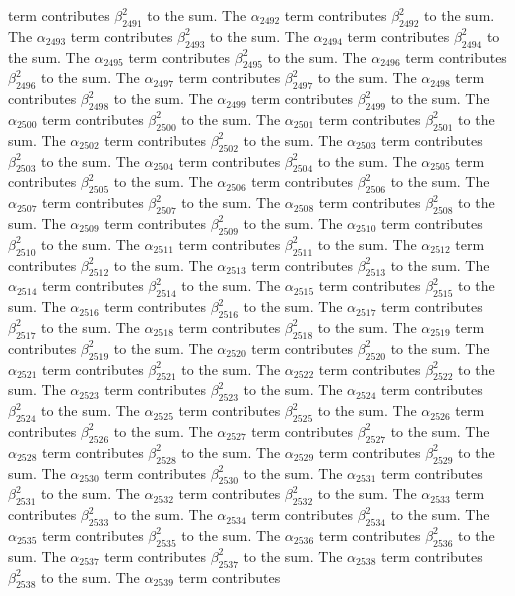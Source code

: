 \begin{lemma}
term contributes $\beta_{2491}^{2}$ to the sum. The $\alpha_{2492}$ term contributes $\beta_{2492}^{2}$ to the sum. The $\alpha_{2493}$ term contributes $\beta_{2493}^{2}$ to the sum. The $\alpha_{2494}$ term contributes $\beta_{2494}^{2}$ to the sum. The $\alpha_{2495}$ term contributes $\beta_{2495}^{2}$ to the sum. The $\alpha_{2496}$ term contributes $\beta_{2496}^{2}$ to the sum. The $\alpha_{2497}$ term contributes $\beta_{2497}^{2}$ to the sum. The $\alpha_{2498}$ term contributes $\beta_{2498}^{2}$ to the sum. The $\alpha_{2499}$ term contributes $\beta_{2499}^{2}$ to the sum. The $\alpha_{2500}$ term contributes $\beta_{2500}^{2}$ to the sum. The $\alpha_{2501}$ term contributes $\beta_{2501}^{2}$ to the sum. The $\alpha_{2502}$ term contributes $\beta_{2502}^{2}$ to the sum. The $\alpha_{2503}$ term contributes $\beta_{2503}^{2}$ to the sum. The $\alpha_{2504}$ term contributes $\beta_{2504}^{2}$ to the sum. The $\alpha_{2505}$ term contributes $\beta_{2505}^{2}$ to the sum. The $\alpha_{2506}$ term contributes $\beta_{2506}^{2}$ to the sum. The $\alpha_{2507}$ term contributes $\beta_{2507}^{2}$ to the sum. The $\alpha_{2508}$ term contributes $\beta_{2508}^{2}$ to the sum. The $\alpha_{2509}$ term contributes $\beta_{2509}^{2}$ to the sum. The $\alpha_{2510}$ term contributes $\beta_{2510}^{2}$ to the sum. The $\alpha_{2511}$ term contributes $\beta_{2511}^{2}$ to the sum. The $\alpha_{2512}$ term contributes $\beta_{2512}^{2}$ to the sum. The $\alpha_{2513}$ term contributes $\beta_{2513}^{2}$ to the sum. The $\alpha_{2514}$ term contributes $\beta_{2514}^{2}$ to the sum. The $\alpha_{2515}$ term contributes $\beta_{2515}^{2}$ to the sum. The $\alpha_{2516}$ term contributes $\beta_{2516}^{2}$ to the sum. The $\alpha_{2517}$ term contributes $\beta_{2517}^{2}$ to the sum. The $\alpha_{2518}$ term contributes $\beta_{2518}^{2}$ to the sum. The $\alpha_{2519}$ term contributes $\beta_{2519}^{2}$ to the sum. The $\alpha_{2520}$ term contributes $\beta_{2520}^{2}$ to the sum. The $\alpha_{2521}$ term contributes $\beta_{2521}^{2}$ to the sum. The $\alpha_{2522}$ term contributes $\beta_{2522}^{2}$ to the sum. The $\alpha_{2523}$ term contributes $\beta_{2523}^{2}$ to the sum. The $\alpha_{2524}$ term contributes $\beta_{2524}^{2}$ to the sum. The $\alpha_{2525}$ term contributes $\beta_{2525}^{2}$ to the sum. The $\alpha_{2526}$ term contributes $\beta_{2526}^{2}$ to the sum. The $\alpha_{2527}$ term contributes $\beta_{2527}^{2}$ to the sum. The $\alpha_{2528}$ term contributes $\beta_{2528}^{2}$ to the sum. The $\alpha_{2529}$ term contributes $\beta_{2529}^{2}$ to the sum. The $\alpha_{2530}$ term contributes $\beta_{2530}^{2}$ to the sum. The $\alpha_{2531}$ term contributes $\beta_{2531}^{2}$ to the sum. The $\alpha_{2532}$ term contributes $\beta_{2532}^{2}$ to the sum. The $\alpha_{2533}$ term contributes $\beta_{2533}^{2}$ to the sum. The $\alpha_{2534}$ term contributes $\beta_{2534}^{2}$ to the sum. The $\alpha_{2535}$ term contributes $\beta_{2535}^{2}$ to the sum. The $\alpha_{2536}$ term contributes $\beta_{2536}^{2}$ to the sum. The $\alpha_{2537}$ term contributes $\beta_{2537}^{2}$ to the sum. The $\alpha_{2538}$ term contributes $\beta_{2538}^{2}$ to the sum. The $\alpha_{2539}$ term contributes 
\end{lemma}

